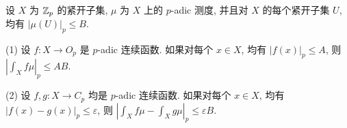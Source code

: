 \begin{Exercises}
\item 设 $X$ 为 $\mathbb{Z}_p$ 的紧开子集, $\mu$ 为 $X$ 上的 $p$-adic 测度, 并且对 $X$ 的每个紧开子集 $U$, 均有 $|\mu(U)|_p\leqslant B$.

(1) 设 $f\colon X\to O_p$ 是 $p$-adic 连续函数. 如果对每个 $x\in X$, 均有 $|f(x)|_p\leqslant A$, 则 $\left|\int_X f\mu\right|_p\leqslant AB$.

(2) 设 $f,g\colon X\to C_p$ 均是 $p$-adic 连续函数. 如果对每个 $x\in X$, 均有 $|f(x)-g(x)|_p\leqslant\varepsilon$, 则 $\left|\int_X f\mu-\int_X g\mu\right|_p\leqslant\varepsilon B$.
\end{Exercises}
